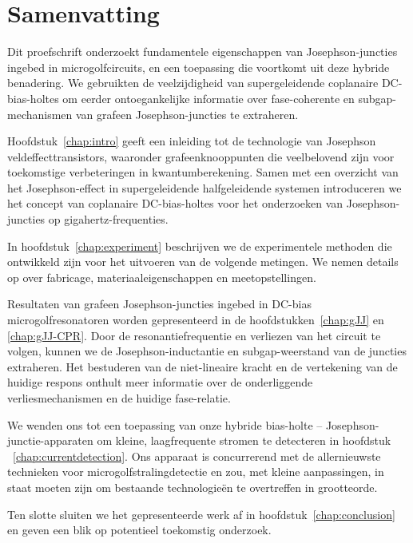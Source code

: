 
\chapter*{Samenvatting}

{%

Dit proefschrift onderzoekt fundamentele eigenschappen van Josephson-juncties ingebed in microgolfcircuits, en een toepassing die voortkomt uit deze hybride benadering.
%
We gebruikten de veelzijdigheid van supergeleidende coplanaire DC-bias-holtes om eerder ontoegankelijke informatie over fase-coherente en subgap-mechanismen van grafeen Josephson-juncties te extraheren.

\noindent\newline
Hoofdstuk~\ref{chap:intro} geeft een inleiding tot de technologie van Josephson veldeffecttransistors, waaronder grafeenknooppunten die veelbelovend zijn voor toekomstige verbeteringen in kwantumberekening.
%
Samen met een overzicht van het Josephson-effect in supergeleidende halfgeleidende systemen introduceren we het concept van coplanaire DC-bias-holtes voor het onderzoeken van Josephson-juncties op gigahertz-frequenties.

\noindent\newline
In hoofdstuk~\ref{chap:experiment} beschrijven we de experimentele methoden die ontwikkeld zijn voor het uitvoeren van de volgende metingen.
%
We nemen details op over fabricage, materiaaleigenschappen en meetopstellingen.

\noindent\newline
Resultaten van grafeen Josephson-juncties ingebed in DC-bias microgolfresonatoren worden gepresenteerd in de hoofdstukken~\ref{chap:gJJ} en \ref{chap:gJJ-CPR}.
%
Door de resonantiefrequentie en verliezen van het circuit te volgen, kunnen we de Josephson-inductantie en subgap-weerstand van de juncties extraheren.
%
Het bestuderen van de niet-lineaire kracht en de vertekening van de huidige respons onthult meer informatie over de onderliggende verliesmechanismen en de huidige fase-relatie.

\noindent\newline
We wenden ons tot een toepassing van onze hybride bias-holte -- Josephson-junctie-apparaten om kleine, laagfrequente stromen te detecteren in hoofdstuk ~\ref{chap:currentdetection}.
%
Ons apparaat is concurrerend met de allernieuwste technieken voor microgolfstralingdetectie en zou, met kleine aanpassingen, in staat moeten zijn om bestaande technologieën te overtreffen in grootteorde.

\noindent\newline
Ten slotte sluiten we het gepresenteerde werk af in hoofdstuk~\ref{chap:conclusion} en geven een blik op potentieel toekomstig onderzoek.

}

